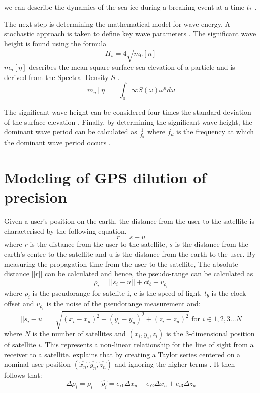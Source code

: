 we can describe the dynamics of the sea ice during a breaking event at a time $t_*$  \cite{williams2013wave}. \par

The next step is determining the mathematical model for wave energy. A stochastic approach is taken to define key wave parameters \cite{williams2013wave}. The significant wave height is found using the formula
\begin{equation}
	H_s = 4\sqrt{m_0[n]}
\end{equation}
$m_n[\eta]$ describes the mean square surface sea elevation of a particle and is derived from the Spectral Density $S$ \cite{williams2013wave}.
\begin{equation}
	m_n[\eta] = \int_{0}{\infty}S(\omega)\omega^nd\omega
\end{equation}

The significant wave height can be considered four times the standard deviation of the surface elevation \cite{meylan2014situ}. Finally, by determining the significant wave height, the dominant wave period can be calculated as $\frac{1}{f_d}$ where $f_d$ is the frequency at which the dominant wave period occurs \cite{meylan2014situ}.

\section{ Modeling of GPS dilution of precision}
\label{appendix:GPS_DOP} 
Given a user's position on the earth, the distance from the user to the satellite is characterised by the following equation.
\begin{equation}
	r =  s - u
\end{equation}
where $r$ is the distance from the user to the satellite, $s$ is the distance from the earth's centre to the satellite and u is the distance from the earth to the user. By measuring the propagation time from the user to the satellite, The absolute distance $||r||$ can be calculated and hence, the pseudo-range can be calculated as
\begin{equation}
	\rho_i = ||s_i-u||+ct_b + v_{\rho_i}
\end{equation}
where $\rho_i$ is the pseudorange for satelite i, c is the speed of light, $t_b$ is  the clock offset and $v_{\rho_i}$ is the noise of the pseudorange measurement and:
\begin{equation}
	||s_i-u|| = \sqrt{(x_i - x_u)^2+(y_i-y_u)^2+(z_i-z_u)^2} \text{ for } i \in 1,2,3...N \label{los}
\end{equation}
where $N$ is the number of satellites and $(x_i,y_i,z_i)$ is the 3-dimensional position of satellite $i$. This represents a non-linear relationship for the line of sight from a receiver to a satellite.  \textcite{jwo2001efficient} explains that by creating a Taylor series centered on a nominal user position $(\hat{x_n},\hat{y_n},\hat{z_n})$ and ignoring the higher terms \cite{jwo2001efficient}. It then follows that:
\begin{equation}
	\Delta\rho_i = \rho_i - \hat{\rho_i} = e_{i1}\Delta x_u + e_{i2}\Delta x_u +  e_{i3}\Delta z_u
\end{equation}

